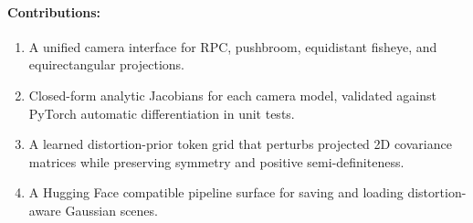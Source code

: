 \documentclass{article}
\begin{document}
\paragraph{Contributions:}
\begin{enumerate}
  \item A unified camera interface for RPC, pushbroom, equidistant fisheye, and equirectangular projections.
  \item Closed-form analytic Jacobians for each camera model, validated against PyTorch automatic differentiation in unit tests.
  \item A learned distortion-prior token grid that perturbs projected 2D covariance matrices while preserving symmetry and positive semi-definiteness.
  \item A Hugging Face compatible pipeline surface for saving and loading distortion-aware Gaussian scenes.
\end{enumerate}
\end{document}
